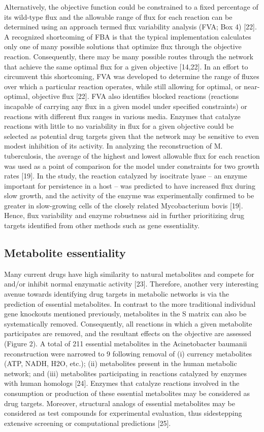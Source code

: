 Alternatively, the objective function could be constrained to a fixed 
percentage of its wild-type flux and the allowable range of flux 
for each reaction can be determined using an approach termed flux 
variability analysis (FVA; Box 4) [22]. A recognized shortcoming 
of FBA is that the typical implementation calculates only one 
of many possible solutions that optimize flux through the objective 
reaction. Consequently, there may be many possible routes through 
the network that achieve the same optimal flux for a given 
objective [14,22]. In an effort to circumvent this shortcoming, 
FVA was developed to determine the range of fluxes over which 
a particular reaction operates, while still allowing for 
optimal, or near-optimal, objective flux [22]. FVA also identifies 
blocked reactions (reactions incapable of carrying any flux in 
a given model under specified constraints) or reactions with 
different flux ranges in various media. Enzymes that catalyze 
reactions with little to no variability in flux for a given 
objective could be selected as potential drug targets given that 
the network may be sensitive to even modest inhibition of its 
activity. In analyzing the reconstruction of M. tuberculosis, the 
average of the highest and lowest allowable flux for each reaction 
was used as a point of comparison for the model under constraints 
for two growth rates [19]. In the study, the reaction catalyzed by 
isocitrate lyase – an enzyme important for persistence in a 
host – was predicted to have increased flux during slow growth, 
and the activity of the enzyme was experimentally confirmed to 
be greater in slow-growing cells of the closely related 
Mycobacterium bovis [19]. Hence, flux variability and enzyme 
robustness aid in further prioritizing drug targets identified 
from other methods such as gene essentiality.

\subsection{Metabolite essentiality}
Many current drugs have high similarity to natural metabolites and 
compete for and/or inhibit normal enzymatic activity [23]. Therefore, 
another very interesting avenue towards identifying drug targets 
in metabolic networks is via the prediction of essential metabolites. 
In contrast to the more traditional individual gene knockouts 
mentioned previously, metabolites in the S matrix can also be 
systematically removed. Consequently, all reactions in which a 
given metabolite participates are removed, and the resultant 
effects on the objective are assessed (Figure 2). A total of 
211 essential metabolites in the Acinetobacter baumanii 
reconstruction were narrowed to 9 following removal of (i) currency 
metabolites (ATP, NADH, H2O, etc.); (ii) metabolites present in 
the human metabolic network; and (iii) metabolites participating 
in reactions catalyzed by enzymes with human homologs [24]. 
Enzymes that catalyze reactions involved in the consumption or 
production of these essential metabolites may be considered 
as drug targets. Moreover, structural analogs of essential 
metabolites may be considered as test compounds for experimental 
evaluation, thus sidestepping extensive screening or 
computational predictions [25].


